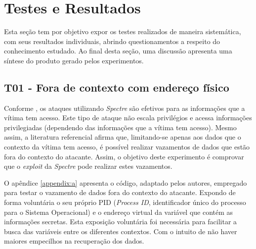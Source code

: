 \documentclass[
	article,			    %
	12pt,				    %
	oneside,			    %
	a4paper,			    %
	chapter=TITLE,		    %
	section=TITLE,		    %
	subsection=TITLE,	    %
	english,			    %
	brazil,				    %
	sumario=tradicional
]{abntex2}
\begin{document}
\section{Testes e Resultados}
Esta seção tem por objetivo expor os testes realizados de maneira sistemática, com seus resultados individuais, abrindo questionamentos a respeito do conhecimento estudado. Ao final desta seção, uma discussão apresenta uma síntese do produto gerado pelos experimentos.
\subsection{T01 - Fora de contexto com endereço físico}
Conforme , os ataques utilizando \emph{Spectre} são efetivos para as informações que a vítima tem acesso. Este tipo de ataque não escala privilégios e acessa informações privilegiadas (dependendo das informações que a vítima tem acesso). Mesmo assim, a literatura referencial afirma que, limitando-se apenas aos dados que o contexto da vítima tem acesso, é possível realizar vazamentos de dados que estão fora do contexto do atacante. Assim, o objetivo deste experimento é comprovar que o \emph{exploit} da \emph{Spectre} pode realizar estes vazamentos.

O apêndice \ref{appendix:a} apresenta o código, adaptado pelos autores, empregado para testar o vazamento de dados fora do contexto do atacante. Expondo de forma voluntária o seu próprio PID (\emph{Process ID}, identificador único do processo para o Sistema Operacional) e o endereço virtual da variável que contém as informações secretas. Esta exposição voluntária foi necessária para facilitar a busca das variáveis entre os diferentes contextos. Com o intuito de não haver maiores empecilhos na recuperação dos dados.
\end{document}
